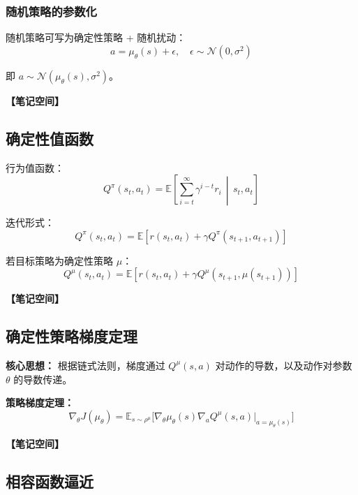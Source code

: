 \documentclass[12pt,a4paper]{article}
\newcommand{\notespace}[1][3cm]{%
  \vspace{#1}%
  \noindent\textbf{【笔记空间】}%
  \vspace{#1}%
}
\newcommand{\E}{\mathbb{E}}
\newcommand{\1}{\mathbf{1}}
\begin{document}
\subsubsection*{随机策略的参数化}

随机策略可写为确定性策略 + 随机扰动：
\begin{equation}
a=\mu_\theta(s)+\epsilon, \quad \epsilon\sim\mathcal{N}(0,\sigma^2)
\end{equation}

即 $a\sim\mathcal{N}(\mu_\theta(s),\sigma^2)$。

\notespace[2cm]

\subsection{确定性值函数}

行为值函数：
\begin{equation}
Q^\pi(s_t,a_t)=\E\left[\sum_{i=t}^{\infty}\gamma^{i-t}r_i\,\middle|\, s_t,a_t\right]
\end{equation}

迭代形式：
\begin{equation}
Q^\pi(s_t,a_t)=\E\left[r(s_t,a_t)+\gamma Q^\pi(s_{t+1},a_{t+1})\right]
\end{equation}

若目标策略为确定性策略 $\mu$：
\begin{equation}
Q^\mu(s_t,a_t)=\E\left[r(s_t,a_t)+\gamma Q^\mu(s_{t+1},\mu(s_{t+1}))\right]
\end{equation}

\notespace[2cm]

\subsection{确定性策略梯度定理}

\begin{keybox}
\textbf{核心思想：} 根据链式法则，梯度通过 $Q^\mu(s,a)$ 对动作的导数，以及动作对参数 $\theta$ 的导数传递。

\textbf{策略梯度定理：}
\begin{equation}
\nabla_\theta J(\mu_\theta)=\E_{s\sim\rho^\mu}\bigl[\nabla_\theta\mu_\theta(s)\nabla_a Q^\mu(s,a)\big|_{a=\mu_\theta(s)}\bigr]
\end{equation}
\end{keybox}

\notespace[2cm]

\subsection{相容函数逼近}
\end{document}
